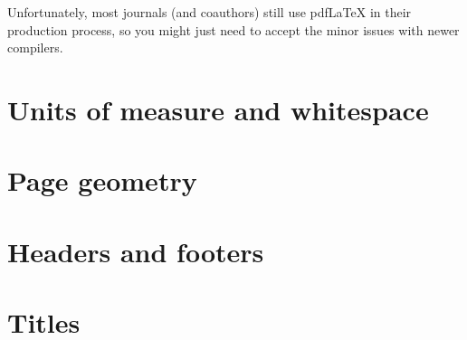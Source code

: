 \begin{practices}
Unfortunately, most journals (and coauthors)
still use pdfLaTeX in their production process,
so you might just need to accept the minor issues with newer compilers.
\end{practices}


%
%
%
\section{Units of measure and whitespace}


\section{Page geometry}




\section{Headers and footers}

\section{Titles}
